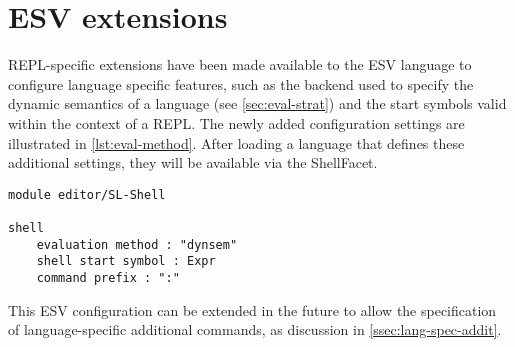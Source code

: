 \section{ESV extensions}
\label{sec:esv-extensions}

REPL-specific extensions have been made available to the ESV language to
configure language specific features, such as the backend used to specify the
dynamic semantics of a language (see \cref{sec:eval-strat}) and the start
symbols valid within the context of a REPL. The newly added configuration
settings are illustrated in \cref{lst:eval-method}. After loading a language
that defines these additional settings, they will be available via the
ShellFacet.

\begin{lstlisting}[language=esv,caption={Configuring language specific settings.},label={lst:eval-method}]
module editor/SL-Shell

shell
    evaluation method : "dynsem"
    shell start symbol : Expr
    command prefix : ":"
\end{lstlisting}

This ESV configuration can be extended in the future to allow the specification
of language-specific additional commands, as discussion in
\cref{ssec:lang-spec-addit}.

